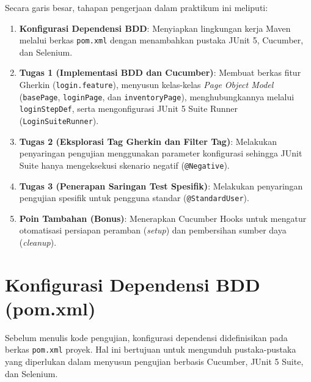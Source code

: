 \documentclass[a4paper,oneside,11pt]{book}
\begin{document}
Secara garis besar, tahapan pengerjaan dalam praktikum ini meliputi:
\begin{enumerate}
    \item \textbf{Konfigurasi Dependensi BDD}: Menyiapkan lingkungan kerja Maven melalui berkas \texttt{pom.xml} dengan menambahkan pustaka JUnit 5, Cucumber, dan Selenium.
    \item \textbf{Tugas 1 (Implementasi BDD dan Cucumber)}: Membuat berkas fitur Gherkin (\texttt{login.feature}), menyusun kelas-kelas \textit{Page Object Model} (\texttt{basePage}, \texttt{loginPage}, dan \texttt{inventoryPage}), menghubungkannya melalui \texttt{loginStepDef}, serta mengonfigurasi JUnit 5 Suite Runner (\texttt{LoginSuiteRunner}).
    \item \textbf{Tugas 2 (Eksplorasi Tag Gherkin dan Filter Tag)}: Melakukan penyaringan pengujian menggunakan parameter konfigurasi sehingga JUnit Suite hanya mengeksekusi skenario negatif (\texttt{@Negative}).
    \item \textbf{Tugas 3 (Penerapan Saringan Test Spesifik)}: Melakukan penyaringan pengujian spesifik untuk pengguna standar (\texttt{@StandardUser}).
    \item \textbf{Poin Tambahan (Bonus)}: Menerapkan Cucumber Hooks untuk mengatur otomatisasi persiapan peramban (\textit{setup}) dan pembersihan sumber daya (\textit{cleanup}).
\end{enumerate}

\section{Konfigurasi Dependensi BDD (pom.xml)}
Sebelum menulis kode pengujian, konfigurasi dependensi didefinisikan pada berkas \texttt{pom.xml} proyek. Hal ini bertujuan untuk mengunduh pustaka-pustaka yang diperlukan dalam menyusun pengujian berbasis Cucumber, JUnit 5 Suite, dan Selenium.
\end{document}
